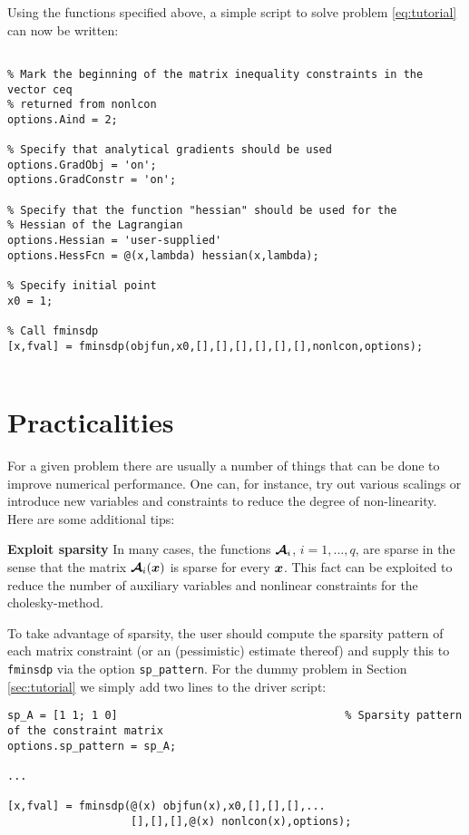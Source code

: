 \documentclass{article}
\newcommand{\bm}[1]{\mbox{\boldmath $#1$}}
\begin{document}
Using the functions specified above, a simple script to solve problem \eqref{eq:tutorial} can now be written:

\begin{verbatim}

% Mark the beginning of the matrix inequality constraints in the vector ceq 
% returned from nonlcon
options.Aind = 2;

% Specify that analytical gradients should be used
options.GradObj = 'on';
options.GradConstr = 'on';

% Specify that the function "hessian" should be used for the
% Hessian of the Lagrangian
options.Hessian = 'user-supplied'
options.HessFcn = @(x,lambda) hessian(x,lambda);

% Specify initial point
x0 = 1;

% Call fminsdp
[x,fval] = fminsdp(objfun,x0,[],[],[],[],[],[],nonlcon,options);
				   
\end{verbatim}	





\section{Practicalities}
\label{sec:practicalities}

For a given problem there are usually a number of things that can be done to improve numerical performance. One can, for instance, try out various scalings or introduce new variables and constraints to reduce the degree of non-linearity. Here are some additional tips: 

\vskip 5mm
\noindent\textbf{Exploit sparsity}
\vskip 2mm
\noindent In many cases, the functions $\bm{\mathcal{A}}_{i}$, $i = 1,...,q$, are sparse in the sense that the matrix $\bm{\mathcal{A}}_{i}(\bm{x})$
is sparse for every $\bm{x}$. This fact can be exploited to reduce the number of auxiliary variables and nonlinear constraints for the cholesky-method.

To take advantage of sparsity, the user should compute the sparsity pattern of each matrix constraint (or
an (pessimistic) estimate thereof) and supply this to \texttt{fminsdp} via the option \texttt{sp\_pattern}. For the
dummy problem in Section \ref{sec:tutorial} we simply add two lines to the driver script:
\begin{verbatim}
sp_A = [1 1; 1 0]					  		        % Sparsity pattern of the constraint matrix
options.sp_pattern = sp_A;

...

[x,fval] = fminsdp(@(x) objfun(x),x0,[],[],[],...
				   [],[],[],@(x) nonlcon(x),options);

\end{verbatim}
\end{document}
